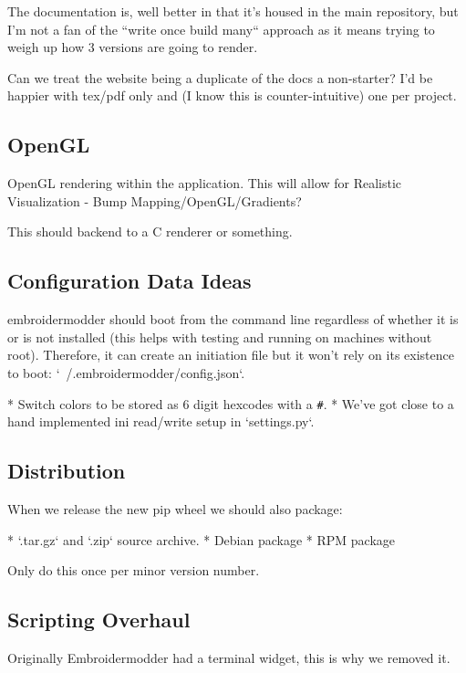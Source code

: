 \documentclass[a4paper]{report}
\begin{document}
The documentation is, well better in that it's housed in the main repository,
but I'm not a fan of the ``write once build many`` approach as it means
trying to weigh up how 3 versions are going to render.

Can we treat the website being a duplicate of the docs a non-starter?
I'd be happier with tex/pdf only and (I know this is counter-intuitive) one
per project.

\subsection{OpenGL}

OpenGL rendering within the application. This will allow for
Realistic Visualization - Bump Mapping/OpenGL/Gradients?

This should backend to a C renderer or something.

\subsection{Configuration Data Ideas}

embroidermodder should boot from the command line
regardless of whether it is or is not installed (this helps with testing and
running on machines without root). Therefore, it can create an initiation file
but it won't rely on its existence to boot: `~/.embroidermodder/config.json`.

* Switch colors to be stored as 6 digit hexcodes with a \texttt{\#}.
* We've got close to a hand implemented ini read/write setup in `settings.py`.

\subsection{Distribution}

When we release the new pip wheel we should also package:

* `.tar.gz` and `.zip` source archive.
* Debian package
* RPM package

Only do this once per minor version number.

\subsection{Scripting Overhaul}

Originally Embroidermodder had a terminal widget, this is why we removed it.
\end{document}
